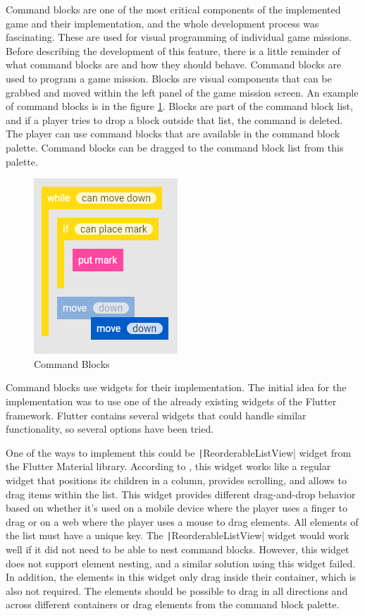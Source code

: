 Command blocks are one of the most critical components of the implemented game and their implementation, and the whole development process was fascinating.
These are used for visual programming of individual game missions.
Before describing the development of this feature, there is a little reminder of what command blocks are and how they should behave.
Command blocks are used to program a game mission.
Blocks are visual components that can be grabbed and moved within the left panel of the game mission screen.
An example of command blocks is in the figure \ref{fig:commandblocks}.
Blocks are part of the command block list, and if a player tries to drop a block outside that list, the command is deleted.
The player can use command blocks that are available in the command block palette.
Command blocks can be dragged to the command block list from this palette.

\begin{figure}
    \centering
    \includegraphics[width=0.4\linewidth]{assets/implementation/commandblocks.png}
    \caption{Command Blocks}
    \label{fig:commandblocks}
\end{figure}

Command blocks use widgets for their implementation.
The initial idea for the implementation was to use one of the already existing widgets of the Flutter framework.
Flutter contains several widgets that could handle similar functionality, so several options have been tried.

One of the ways to implement this could be \texttt|ReorderableListView| widget from the Flutter Material library.
According to \cite{a2022_material}, this widget works like a regular widget that positions its children in a column, provides scrolling, and allows to drag items within the list.
This widget provides different drag-and-drop behavior based on whether it's used on a mobile device where the player uses a finger to drag or on a web where the player uses a mouse to drag elements.
All elements of the list must have a unique key.
The \texttt|ReorderableListView| widget would work well if it did not need to be able to nest command blocks.
However, this widget does not support element nesting, and a similar solution using this widget failed.
In addition, the elements in this widget only drag inside their container, which is also not required.
The elements should be possible to drag in all directions and across different containers or drag elements from the command block palette.

